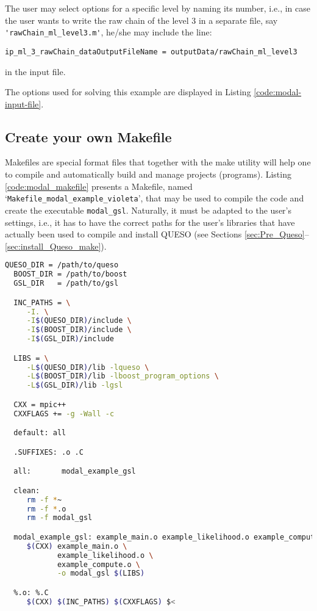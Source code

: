 The user may select options for a specific level by naming its number, i.e., in case the user wants to write the raw chain of the level 3 in a separate file, say \verb+'rawChain_ml_level3.m'+, he/she may include the line: 
\begin{lstlisting}
ip_ml_3_rawChain_dataOutputFileName = outputData/rawChain_ml_level3 
\end{lstlisting}
in the input file.


The options used for solving this example are displayed in Listing \ref{code:modal-input-file}. 





\subsection{Create your own Makefile}\label{sec:modal-makefile}

Makefiles are special format files that together with the make utility will help one to compile and automatically build and manage projects (programs).  
Listing \ref{code:modal_makefile} presents a Makefile, named `\texttt{Makefile\_modal\_example\_violeta}', that may be used to compile the code and create the executable \verb+modal_gsl+. Naturally, it must be adapted to the user's settings, i.e., it has to have the correct paths for the user's libraries that have actually been used to compile and install QUESO  (see Sections \ref{sec:Pre_Queso}--\ref{sec:install_Queso_make}).

\begin{lstlisting}[caption={Makefile for the application code in Listings
  \ref{code:modal-main-c}-\ref{code:modal-compute-c}},
  label={code:modal_makefile},
  language={bash}]
  QUESO_DIR = /path/to/queso
  BOOST_DIR = /path/to/boost
  GSL_DIR   = /path/to/gsl

  INC_PATHS = \
     -I. \
     -I$(QUESO_DIR)/include \
     -I$(BOOST_DIR)/include \
     -I$(GSL_DIR)/include

  LIBS = \
     -L$(QUESO_DIR)/lib -lqueso \
     -L$(BOOST_DIR)/lib -lboost_program_options \
     -L$(GSL_DIR)/lib -lgsl

  CXX = mpic++
  CXXFLAGS += -g -Wall -c

  default: all

  .SUFFIXES: .o .C

  all:       modal_example_gsl

  clean:
     rm -f *~
     rm -f *.o
     rm -f modal_gsl

  modal_example_gsl: example_main.o example_likelihood.o example_compute.o
     $(CXX) example_main.o \
            example_likelihood.o \
            example_compute.o \
            -o modal_gsl $(LIBS)

  %.o: %.C
     $(CXX) $(INC_PATHS) $(CXXFLAGS) $<
\end{lstlisting}

